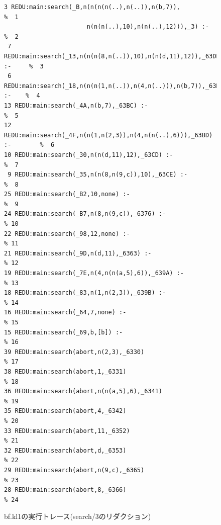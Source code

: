 \documentclass[a4,titlepage]{jsreport}
\begin{document}
\begin{figure}
\begin{center}
\begin{Verbatim}[baselinestretch=0.8]
 3 REDU:main:search(_B,n(n(n(n(..),n(..)),n(b,7)),                      %  1
                       n(n(n(..),10),n(n(..),12))),_3) :-               %  2
 7 REDU:main:search(_13,n(n(n(8,n(..)),10),n(n(d,11),12)),_63DF) :-     %  3
 6 REDU:main:search(_18,n(n(n(1,n(..)),n(4,n(..))),n(b,7)),_63E0) :-    %  4
13 REDU:main:search(_4A,n(b,7),_63BC) :-                                %  5
12 REDU:main:search(_4F,n(n(1,n(2,3)),n(4,n(n(..),6))),_63BD) :-        %  6
10 REDU:main:search(_30,n(n(d,11),12),_63CD) :-                         %  7
 9 REDU:main:search(_35,n(n(8,n(9,c)),10),_63CE) :-                     %  8
25 REDU:main:search(_B2,10,none) :-                                     %  9
24 REDU:main:search(_B7,n(8,n(9,c)),_6376) :-                           % 10
22 REDU:main:search(_98,12,none) :-                                     % 11
21 REDU:main:search(_9D,n(d,11),_6363) :-                               % 12
19 REDU:main:search(_7E,n(4,n(n(a,5),6)),_639A) :-                      % 13
18 REDU:main:search(_83,n(1,n(2,3)),_639B) :-                           % 14
16 REDU:main:search(_64,7,none) :-                                      % 15
15 REDU:main:search(_69,b,[b]) :-                                       % 16
39 REDU:main:search(abort,n(2,3),_6330)                                 % 17
38 REDU:main:search(abort,1,_6331)                                      % 18
36 REDU:main:search(abort,n(n(a,5),6),_6341)                            % 19
35 REDU:main:search(abort,4,_6342)                                      % 20
33 REDU:main:search(abort,11,_6352)                                     % 21
32 REDU:main:search(abort,d,_6353)                                      % 22
29 REDU:main:search(abort,n(9,c),_6365)                                 % 23
28 REDU:main:search(abort,8,_6366)                                      % 24
\end{Verbatim}
\caption{bf.kl1の実行トレース(search/3のリダクション)}
\label{search_bf_log}
\end{center}
\end{figure}
\end{document}
